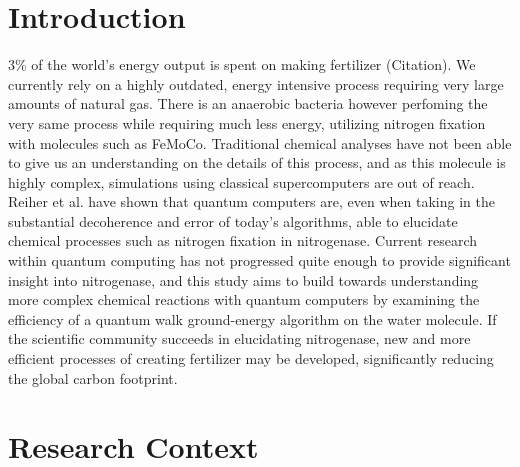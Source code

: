 \documentclass{article}
\begin{document}


\section{Introduction}

\cite{bla}

3\% of the world's energy output is spent on making fertilizer (Citation). We currently rely on a highly outdated, energy intensive process requiring very large amounts of natural gas. There is an anaerobic bacteria however perfoming the very same process while requiring much less energy, utilizing nitrogen fixation with molecules such as FeMoCo. Traditional chemical analyses have not been able to give us an understanding on the details of this process, and as this molecule is highly complex, simulations using classical supercomputers are out of reach. Reiher et al. have shown that quantum computers are, even when taking in the substantial decoherence and error of today's algorithms, able to elucidate chemical processes such as nitrogen fixation in nitrogenase. Current research within quantum computing has not progressed quite enough to provide significant insight into nitrogenase, and this study aims to build towards understanding more complex chemical reactions with quantum computers by examining the efficiency of a quantum walk ground-energy algorithm on the water molecule. If the scientific community succeeds in elucidating nitrogenase, new and more efficient processes of creating fertilizer may be developed, significantly reducing the global carbon footprint.



\section{Research Context}
\end{document}
